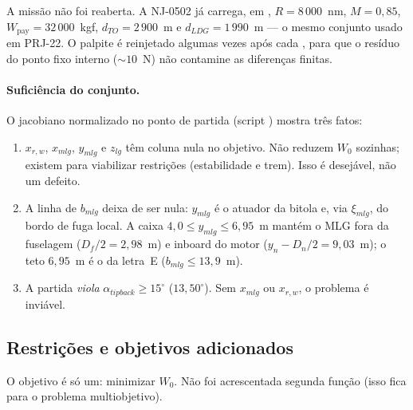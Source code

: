 A missão não foi reaberta. A NJ-0502 já carrega, em
, $R=8\,000$~nm, $M=0{,}85$,
$W_{\mathrm{pay}}=32\,000$~kgf, $d_{TO}=2\,900$~m e
$d_{LDG}=1\,990$~m --- o mesmo conjunto usado em PRJ-22. O palpite
 é reinjetado algumas vezes após cada ,
para que o resíduo do ponto fixo interno ($\sim 10$~N) não contamine as
diferenças finitas.

\paragraph{Suficiência do conjunto.}
O jacobiano normalizado no ponto de partida (script
) mostra três fatos:
\begin{enumerate}
\item $x_{r,w}$, $x_{mlg}$, $y_{mlg}$ e $z_{lg}$ têm coluna nula no
      objetivo. Não reduzem $W_0$ sozinhas; existem para viabilizar
      restrições (estabilidade e trem). Isso é desejável, não
      um defeito.
\item A linha de $b_{mlg}$ deixa de ser nula: $y_{mlg}$ é o atuador da
      bitola e, via $\xi_{mlg}$, do bordo de fuga local. A caixa
      $4{,}0\le y_{mlg}\le 6{,}95$~m mantém o MLG fora da fuselagem
      ($D_f/2=2{,}98$~m) e inboard do motor ($y_n-D_n/2=9{,}03$~m); o teto
      $6{,}95$~m é o da letra~E ($b_{mlg}\le 13{,}9$~m).
\item A partida \emph{viola} $\alpha_{tipback}\ge 15^\circ$
      ($13{,}50^\circ$). Sem $x_{mlg}$ ou $x_{r,w}$, o problema é
      inviável.
\end{enumerate}

\subsection{Restrições e objetivos adicionados}
\label{sec:p3q2}

O objetivo é só um: minimizar $W_0$. Não foi acrescentada segunda
função (isso fica para o problema multiobjetivo).

